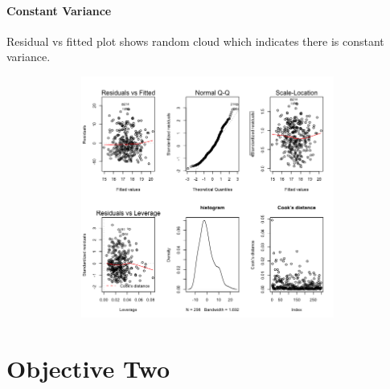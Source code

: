 \documentclass[american,]{article}
\let\oldparagraph\paragraph
\renewcommand{\paragraph}[1]{\oldparagraph{#1}\mbox{}}
\begin{document}
\paragraph{Constant Variance}
Residual vs fitted plot shows random cloud which indicates there is constant variance.

\graphicspath{ {images/} }
\includegraphics[width=500px,height=300px]{img002.png}

\section{Objective Two}\label{objective-two}

\renewcommand\refname{Conclusion}





\end{document}
